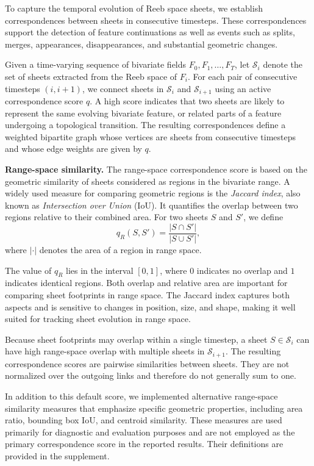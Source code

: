 \documentclass[review]{vgtc}                          %
\newcommand{\Sheets}{\mathcal{S}}
\newcommand{\Sheet}{S}
\newcommand{\myparagraph}[1]{\vspace{1mm} \noindent \textbf{#1}}
\begin{document}
To capture the temporal evolution of Reeb space sheets, we establish correspondences between sheets in consecutive timesteps. These correspondences support the detection of feature continuations as well as events such as splits, merges, appearances, disappearances, and substantial geometric changes.

Given a time-varying sequence of bivariate fields $F_0, F_1, \ldots, F_T$, let $\Sheets_i$ denote the set of sheets extracted from the Reeb space of $F_i$. For each pair of consecutive timesteps $(i,i+1)$, we connect sheets in $\Sheets_i$ and $\Sheets_{i+1}$ using an active correspondence score $q$. A high score indicates that two sheets are likely to represent the same evolving bivariate feature, or related parts of a feature undergoing a topological transition. The resulting correspondences define a weighted bipartite graph whose vertices are sheets from consecutive timesteps and whose edge weights are given by $q$.

\myparagraph{Range-space similarity.}
The range-space correspondence score is based on the geometric similarity of sheets considered as regions in the bivariate range. A widely used measure for comparing geometric regions is the \emph{Jaccard index}, also known as \emph{Intersection over Union} (IoU). It quantifies the overlap between two regions relative to their combined area. For two sheets $\Sheet$ and $\Sheet'$, we define
$$
q_R(\Sheet,\Sheet') =
\frac{|\Sheet \cap \Sheet'|}
{|\Sheet \cup \Sheet'|},
$$
where $|\cdot|$ denotes the area of a region in range space.

The value of $q_R$ lies in the interval $[0,1]$, where $0$ indicates no overlap and $1$ indicates identical regions. Both overlap and relative area are important for comparing sheet footprints in range space. The Jaccard index captures both aspects and is sensitive to changes in position, size, and shape, making it well suited for tracking sheet evolution in range space.

Because sheet footprints may overlap within a single timestep, a sheet $\Sheet\in\Sheets_i$ can have high range-space overlap with multiple sheets in $\Sheets_{i+1}$. The resulting correspondence scores are pairwise similarities between sheets. They are not normalized over the outgoing links and therefore do not generally sum to one.

In addition to this default score, we implemented alternative range-space similarity measures that emphasize specific geometric properties, including area ratio, bounding box IoU, and centroid similarity. These measures are used primarily for diagnostic and evaluation purposes and are not employed as the primary correspondence score in the reported results. Their definitions are provided in the supplement.
\end{document}
